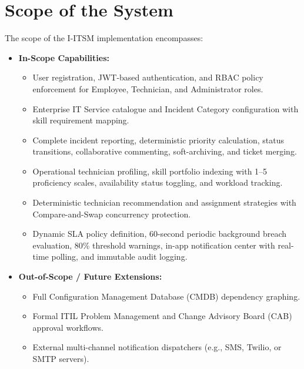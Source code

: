 \documentclass[11pt,a4paper,oneside]{report}
\begin{document}
\section{Scope of the System}
\label{sec:intro_scope}
The scope of the I-ITSM implementation encompasses:
\begin{itemize}
    \item \textbf{In-Scope Capabilities:}
    \begin{itemize}
        \item User registration, JWT-based authentication, and RBAC policy enforcement for Employee, Technician, and Administrator roles.
        \item Enterprise IT Service catalogue and Incident Category configuration with skill requirement mapping.
        \item Complete incident reporting, deterministic priority calculation, status transitions, collaborative commenting, soft-archiving, and ticket merging.
        \item Operational technician profiling, skill portfolio indexing with 1--5 proficiency scales, availability status toggling, and workload tracking.
        \item Deterministic technician recommendation and assignment strategies with Compare-and-Swap concurrency protection.
        \item Dynamic SLA policy definition, 60-second periodic background breach evaluation, 80\% threshold warnings, in-app notification center with real-time polling, and immutable audit logging.
    \end{itemize}
    \item \textbf{Out-of-Scope / Future Extensions:}
    \begin{itemize}
        \item Full Configuration Management Database (CMDB) dependency graphing.
        \item Formal ITIL Problem Management and Change Advisory Board (CAB) approval workflows.
        \item External multi-channel notification dispatchers (e.g., SMS, Twilio, or SMTP servers).
    \end{itemize}
\end{itemize}
\end{document}
